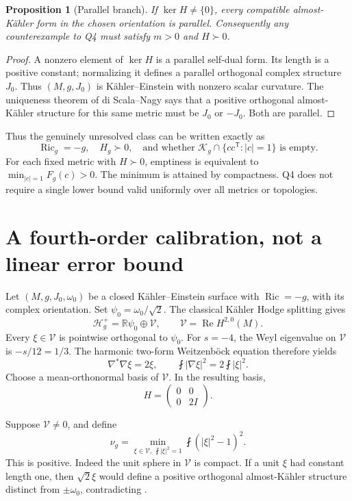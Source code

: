 \documentclass[11pt]{article}
\newtheorem{proposition}{Proposition}[section]
\theoremstyle{remark}\newtheorem{remark}[proposition]{Remark}
\newcommand{\Ric}{\operatorname{Ric}}
\newcommand{\av}{\mathop{\fint}\nolimits}
\newcommand{\HH}{\mathcal H_g^+}
\newcommand{\KK}{\mathcal K_g}
\begin{document}
\begin{proposition}[Parallel branch]
If $\ker H\ne\{0\}$, every compatible almost-K\"ahler form in the chosen orientation is parallel. Consequently any counterexample to Q4 must satisfy $m>0$ and $H\succ0$.
\end{proposition}
\begin{proof}
A nonzero element of $\ker H$ is a parallel self-dual form. Its length is a positive constant; normalizing it defines a parallel orthogonal complex structure $J_0$. Thus $(M,g,J_0)$ is K\"ahler--Einstein with nonzero scalar curvature. The uniqueness theorem of di Scala--Nagy \cite{DN} says that a positive orthogonal almost-K\"ahler structure for this same metric must be $J_0$ or $-J_0$. Both are parallel.
\end{proof}
Thus the genuinely unresolved class can be written exactly as
\begin{equation}
 \Ric_g=-g,\quad H_g\succ0,
 \quad\text{and whether }\KK\cap\{cc^{\mathsf T}:|c|=1\}\text{ is empty}.
 \label{eq:unknown}
\end{equation}
For each fixed metric with $H\succ0$, emptiness is equivalent to $\min_{|c|=1}F_g(c)>0$. The minimum is attained by compactness. Q4 does not require a single lower bound valid uniformly over all metrics or topologies.

\section{A fourth-order calibration, not a linear error bound}
Let $(M,g,J_0,\omega_0)$ be a closed K\"ahler--Einstein surface with $\Ric=-g$, with its complex orientation. Set $\psi_0=\omega_0/\sqrt2$. The classical K\"ahler Hodge splitting gives
\[
 \HH=\mathbb R\psi_0\oplus\mathcal V,
 \qquad\mathcal V=\operatorname{Re}H^{2,0}(M).
\]
Every $\xi\in\mathcal V$ is pointwise orthogonal to $\psi_0$. For $s=-4$, the Weyl eigenvalue on $\mathcal V$ is $-s/12=1/3$. The harmonic two-form Weitzenb\"ock equation therefore yields
\[
 \nabla^*\nabla\xi=2\xi,
 \qquad\av|\nabla\xi|^2=2\av|\xi|^2.
\]
Choose a mean-orthonormal basis of $\mathcal V$. In the resulting basis,
\begin{equation}
 H=\begin{pmatrix}0&0\\0&2I\end{pmatrix}.
 \label{eq:HKE}
\end{equation}

Suppose $\mathcal V\ne0$, and define
\[
 \nu_g=\min_{\xi\in\mathcal V,\ \av|\xi|^2=1}
              \av(|\xi|^2-1)^2.
\]
This is positive. Indeed the unit sphere in $\mathcal V$ is compact. If a unit $\xi$ had constant length one, then $\sqrt2\xi$ would define a positive orthogonal almost-K\"ahler structure distinct from $\pm\omega_0$, contradicting \cite{DN}.
\end{document}
